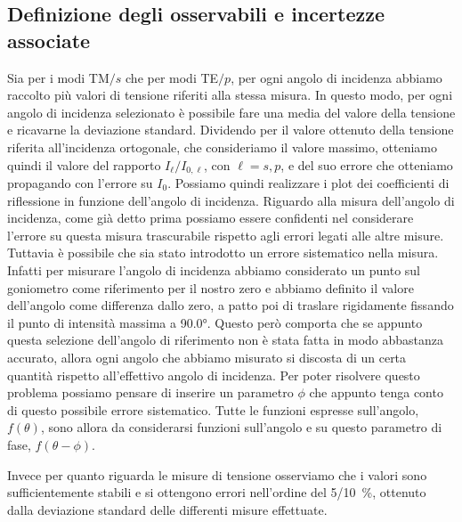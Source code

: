 \documentclass[
    prb,altaffilletter,citeautoscript,
    amsmath,amssymb,
    showpacs,showkeys,floatfix,
    reprint
]{revtex4-1}
\begin{document}
\subsection{Definizione degli osservabili e incertezze associate}

Sia per i modi TM$/s$ che per modi TE$/p$, per ogni angolo di incidenza abbiamo raccolto più valori di tensione riferiti alla stessa misura. In questo modo, per ogni angolo di incidenza selezionato è possibile fare una media del valore della tensione e ricavarne la deviazione standard. Dividendo per il valore ottenuto della tensione riferita all'incidenza ortogonale, che consideriamo il valore massimo, otteniamo quindi il valore del rapporto $I_\ell/I_{0,\ell}$, con $\ell=s,p$, e del suo errore che otteniamo propagando con l'errore su $I_0$. Possiamo quindi realizzare i plot dei coefficienti di riflessione in funzione dell'angolo di incidenza. Riguardo alla misura dell'angolo di incidenza, come già detto prima possiamo essere confidenti nel considerare l'errore su questa misura trascurabile rispetto agli errori legati alle altre misure. Tuttavia è possibile che sia stato introdotto un errore sistematico nella misura. Infatti per misurare l'angolo di incidenza abbiamo considerato un punto sul goniometro come riferimento per il nostro zero e abbiamo definito il valore dell'angolo come differenza dallo zero, a patto poi di traslare rigidamente fissando il punto di intensità massima a \ang{90.0}. Questo però comporta che se appunto questa selezione dell'angolo di riferimento non è stata fatta in modo abbastanza accurato, allora ogni angolo che abbiamo misurato si discosta di un certa quantità rispetto all'effettivo angolo di incidenza. Per poter risolvere questo problema possiamo pensare di inserire un  parametro $\phi$ che appunto tenga conto di questo possibile errore sistematico. Tutte le funzioni espresse sull'angolo, $f(\theta)$, sono allora da considerarsi funzioni sull'angolo e su questo parametro di fase, $f(\theta-\phi)$.

Invece per quanto riguarda le misure di tensione osserviamo che i valori sono sufficientemente stabili e si ottengono errori nell'ordine del \SI[parse-numbers=false]{5/10}{\%}, ottenuto dalla deviazione standard delle differenti misure effettuate. 
\end{document}
